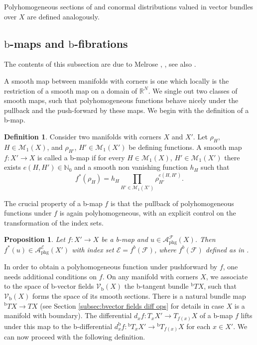 \documentclass[11pt]{article}
\numberwithin{equation}{section}
\theoremstyle{plain}
\newtheorem{Prop}[Th]{Proposition}
\theoremstyle{definition}
\newtheorem{defn}[Th]{Definition}
\newcommand\calM{{\mathcal M}}
\newcommand {\phg}{{\mathrm{phg}}}
\newcommand{\bb}{{\mathrm{b}}}
\begin{document}
Polyhomogeneous sections of and conormal distributions valued in vector bundles over $X$ are defined analogously.

\subsection{\texorpdfstring{$\bb$}{b}-maps and \texorpdfstring{$\bb$}{b}-fibrations}
The contents of this subsection are due to Melrose \cite{Mel:CCDMWC}, \cite{melrose1993atiyah}, see also
\cite[\S 2.A]{mazzeorafe1991elliptic}.

A smooth map between manifolds with corners is
one which locally is the restriction of a smooth map on a
domain of $\mathbb{R}^{N}$. We single out two classes of smooth maps,
such that polyhomogeneous functions behave nicely under the pullback and the push-forward
by these maps. We begin with the definition of a b-map.

\begin{defn} Consider two manifolds with corners $X$ and $X'$.
Let $\rho_H$, \hbox{$H\!\in\!\calM_1(X)$}, and $\rho_{H'}$, $H'\in\calM_1(X')$ be defining functions. A smooth map $f : X' \to X$ is called a b-map
if for every $H\in\calM_1(X)$, $H'\in\calM_1(X')$ there exists $e(H,H') \in \mathbb{N}_0$
and a smooth non vanishing function $h_H$ such that
\begin{equation} \label{hypb}
f^{*}(\rho_{H}) = h_H \prod_{H'\in\calM_1(X')} \rho_{H'}^{e(H,H')}.
\end{equation}
\end{defn}

The crucial property of a b-map $f$ is that the pullback of polyhomogeneous
functions under $f$ is again polyhomogeneous, with an explicit
control on the transformation of the index sets.

\begin{Prop}
Let $f : X' \to X $ be a b-map and
$ u \in \mathcal{A}_{\phg}^{\mathcal{F}}(X)$.
Then $f^{*}(u) \in \mathcal{A}_{\phg}^{\mathcal{E}}(X')$
with index set $\mathcal{E} = f^{b}(\mathcal{F})$,
where $f^{b}(\mathcal{F})$ defined as in
\cite[A12]{mazzeorafe1991elliptic}.
\end{Prop}

In order to obtain a polyhomogeneous function
under pushforward by $f$, one needs additional conditions on $f$.
On any manifold with corners $X$, we associate to the space of b-vector
fields $\mathcal{V}_\bb(X)$ the b-tangent bundle ${}^\bb TX$, such that $\mathcal{V}_\bb(X)$
forms the space of its smooth sections. There is a natural bundle map ${}^\bb TX\to TX$ (see Section \ref{subsec:bvector fields diff ops} for details in case $X$ is a manifold with boundary).
The differential
$d_{x}f: T_{x}X' \to T_{f(x)}X$ of a b-map $f$ lifts under this map to the b-differential $d^{\bb}_{x}f : {}^{\bb}T_{x} X' \to {}^\bb T_{f(x)} X$ for each $x \in X'$. We can now proceed with the following definition.
\end{document}
